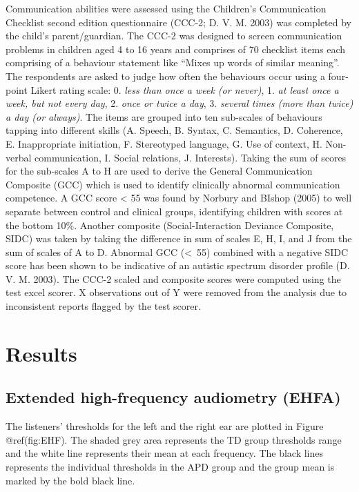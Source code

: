 \documentclass[a4paper,nobind]{templates/ociamthesis}
\begin{document}
Communication abilities were assessed using the Children's Communication
Checklist second edition questionnaire (CCC-2; D. V. M. 2003) was
completed by the child's parent/guardian. The CCC-2 was designed to
screen communication problems in children aged 4 to 16 years and
comprises of 70 checklist items each comprising of a behaviour statement
like ``Mixes up words of similar meaning''. The respondents are asked to
judge how often the behaviours occur using a four-point Likert rating
scale: 0. \emph{less than once a week (or never)}, 1. \emph{at least
once a week, but not every day}, 2. \emph{once or twice a day}, 3.
\emph{several times (more than twice) a day (or always)}. The items are
grouped into ten sub-scales of behaviours tapping into different skills
(A. Speech, B. Syntax, C. Semantics, D. Coherence, E. Inappropriate
initiation, F. Stereotyped language, G. Use of context, H. Non-verbal
communication, I. Social relations, J. Interests). Taking the sum of
scores for the sub-scales A to H are used to derive the General
Communication Composite (GCC) which is used to identify clinically
abnormal communication competence. A GCC score \textless{} 55 was found
by Norbury and BIshop (2005) to well separate between control and
clinical groups, identifying children with scores at the bottom 10\%.
Another composite (Social-Interaction Deviance Composite, SIDC) was
taken by taking the difference in sum of scales E, H, I, and J from the
sum of scales of A to D. Abnormal GCC (\textless~55) combined with a
negative SIDC score has been shown to be indicative of an autistic
spectrum disorder profile (D. V. M. 2003). The CCC-2 scaled and
composite scores were computed using the test excel scorer. X
observations out of Y were removed from the analysis due to inconsistent
reports flagged by the test scorer.

\hypertarget{results}{%
\section{Results}\label{results}}

\hypertarget{extended-high-frequency-audiometry-ehfa-1}{%
\subsection{Extended high-frequency audiometry
(EHFA)}\label{extended-high-frequency-audiometry-ehfa-1}}

The listeners' thresholds for the left and the right ear are plotted in
Figure @ref(fig:EHF). The shaded grey area represents the TD group
thresholds range and the white line represents their mean at each
frequency. The black lines represents the individual thresholds in the
APD group and the group mean is marked by the bold black line.
\end{document}
